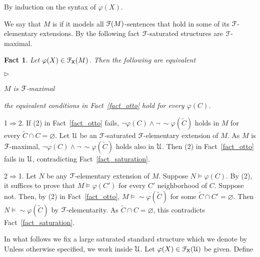 \documentclass{amsproc}
\makeatletter
\newcommand{\mylabel}[1]{{#1}\hfill}
\renewenvironment{itemize}
  {\begin{list}{$\triangleright$}{%
  \setlength{\parskip}{0mm}
  \setlength{\topsep}{.1\baselineskip}
  \setlength{\rightmargin}{0mm}
  \setlength{\listparindent}{0mm}
  \setlength{\itemindent}{0mm}
  \setlength{\labelwidth}{3ex}
  \setlength{\itemsep}{.1\baselineskip}
  \setlength{\parsep}{.1\baselineskip}
  \setlength{\partopsep}{0mm}
  \setlength{\labelsep}{1ex}
  \setlength{\leftmargin}{\labelwidth+\labelsep}
  \let\makelabel\mylabel}}{%
\end{list}}
\newcounter{thm}
\theoremstyle{mio}
\newtheorem{fact}[thm]{Fact}\tcolorboxenvironment{fact}{mythm}
\providecommand{\proofNameStyle}{\bfseries}
\renewenvironment{proof}[1][\proofname]{\par
  \pushQED{\qed}%
  \normalfont%
  \trivlist
  \item[\hskip\labelsep
        \proofNameStyle
    #1\@addpunct{.}]\ignorespaces
}{%
  \popQED\endtrivlist\@endpefalse
}
\renewcommand*{\emph}[1]{%
   \smash{\tikz[baseline]\node[rectangle, fill=teal!25, rounded corners, inner xsep=0.5ex, inner ysep=0.2ex, anchor=base, minimum height = 2.7ex]{\strut #1};}}
\makeatother
\begin{document}
\begin{proof}
  By induction on the syntax of $\varphi(X)$.
\end{proof}

We say that $M$ is \emph{${\EuScript F}$-maximal\/} if it models all ${\EuScript F}(M)$-sentences that hold in some of its ${\EuScript F}$-elementary extensions.
By the following fact ${\EuScript F}$-saturated structures are ${\EuScript F}$-maximal.

\begin{fact}\label{fact_maximal}
  Let $\varphi(X)\in{\EuScript F}_{\sf X}(M)$.
  Then the following are equivalent
  \begin{itemize}
    \item [1.] $M$ is ${\EuScript F}$-maximal
    \item [2.] the equivalent conditions in Fact~\ref{fact_otto} hold for every $\varphi(C)$. 
  \end{itemize}
\end{fact}

\begin{proof}
  1$\Rightarrow$2. If (2) in Fact~\ref{fact_otto} fails, $\neg\varphi(C)\wedge\neg\,{\sim}\varphi(\tilde C)$ holds in $M$ for every $\tilde C\cap C=\varnothing$.
  Let ${\EuScript U}$ be an ${\EuScript F}$-saturated ${\EuScript F}$-elementary extension of $M$.
  As $M$ is ${\EuScript F}$-maximal, $\neg\varphi(C)\wedge\neg\,{\sim}\varphi(\tilde C)$ holds also in ${\EuScript U}$.
  Then (2) in Fact~\ref{fact_otto} fails in ${\EuScript U}$, contradicting Fact~\ref{fact_saturation}.

  2$\Rightarrow$1. 
  Let $N$ be any ${\EuScript F}$-elementary extension of $M$.
  Suppose $N\models\varphi(C)$.
  By (2), it suffices to prove that $M\models\varphi(C')$ for every $C'$ neighborhood of $C$.
  Suppose not. Then, by (2) in Fact~\ref{fact_otto}, $M\models{\sim}\varphi(\tilde C)$ for some $\tilde C\cap C'=\varnothing$.
  Then $N\models{\sim}\varphi(\tilde C)$ by ${\EuScript F}$-elementarity.
  As $\tilde C\cap C=\varnothing$, this contradicts Fact~\ref{fact_saturation}.
\end{proof}

In what follows we fix a large saturated standard structure which we denote by \emph{${\EuScript U}$.}
Unless otherwise specified, we work inside ${\EuScript U}$.
Let $\varphi(X)\in{\EuScript F}_{\sf X}({\EuScript U})$ be given. Define

\end{document}
